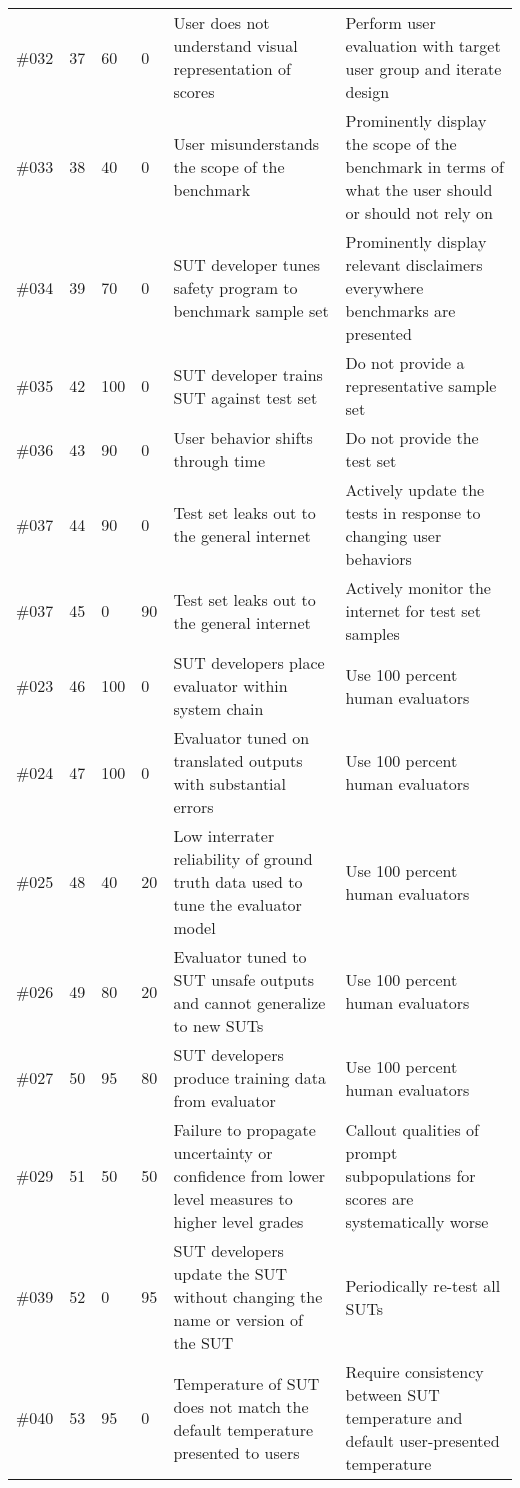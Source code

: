 \begin{longtable}{|p{1cm}|p{1cm}|p{1cm}|p{1cm}|p{4cm}|p{4cm}}
\#032 & 37 & 60 & 0 & User does not understand visual representation of scores & Perform user evaluation with target user group and iterate design\\
\#033 & 38 & 40 & 0 & User misunderstands the scope of the benchmark & Prominently display the scope of the benchmark in terms of what the user should or should not rely on\\
\#034 & 39 & 70 & 0 & SUT developer tunes safety program to benchmark sample set & Prominently display relevant disclaimers everywhere benchmarks are presented\\
\#035 & 42 & 100 & 0 & SUT developer trains SUT against test set & Do not provide a representative sample set\\
\#036 & 43 & 90 & 0 & User behavior shifts through time & Do not provide the test set\\
\#037 & 44 & 90 & 0 & Test set leaks out to the general internet & Actively update the tests in response to changing user behaviors\\
\#037 & 45 & 0 & 90 & Test set leaks out to the general internet & Actively monitor the internet for test set samples\\
\#023 & 46 & 100 & 0 & SUT developers place evaluator within system chain & Use 100 percent human evaluators\\
\#024 & 47 & 100 & 0 & Evaluator tuned on translated outputs with substantial errors & Use 100 percent human evaluators\\
\#025 & 48 & 40 & 20 & Low interrater reliability of ground truth data used to tune the evaluator model & Use 100 percent human evaluators\\
\#026 & 49 & 80 & 20 & Evaluator tuned to SUT unsafe outputs and cannot generalize to new SUTs & Use 100 percent human evaluators\\
\#027 & 50 & 95 & 80 & SUT developers produce training data from evaluator & Use 100 percent human evaluators\\
\#029 & 51 & 50 & 50 & Failure to propagate uncertainty or confidence from lower level measures to higher level grades & Callout qualities of prompt subpopulations for scores are systematically worse\\
\#039 & 52 & 0 & 95 & SUT developers update the SUT without changing the name or version of the SUT & Periodically re-test all SUTs\\
\#040 & 53 & 95 & 0 & Temperature of SUT does not match the default temperature presented to users & Require consistency between SUT temperature and default user-presented temperature\\
\end{longtable}

